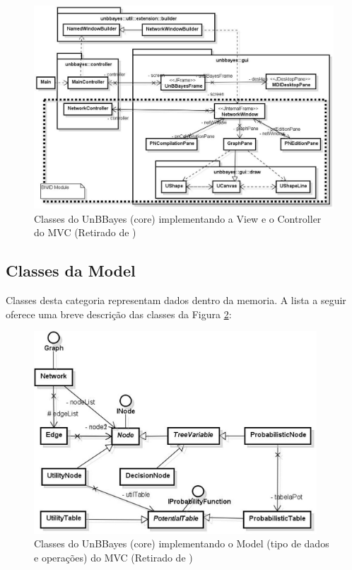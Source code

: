 \begin{figure}[ht]
	\centering
	\includegraphics[width = 450px]{figuras/unbbayes_viewcontrol}
	\caption[UnBBayes View e Controller]{Classes do UnBBayes (core) implementando a View e o Controller do MVC (Retirado de \cite{javaApi11})}
	\label{fig:unbbayes_viewcontrol}
\end{figure}

\subsection{Classes da Model}
Classes desta categoria representam dados dentro da memoria. A lista a seguir oferece uma breve descrição das classes da Figura \ref{fig:unbbayes_model}:
\begin{figure}[ht]
	\centering
	\includegraphics[width = 400px]{figuras/unbbayes_model}
	\caption[UnBBayes UML MVC]{Classes do UnBBayes (core) implementando o Model (tipo de dados e operações) do MVC (Retirado de \cite{javaApi11})}
	\label{fig:unbbayes_model}
\end{figure}


